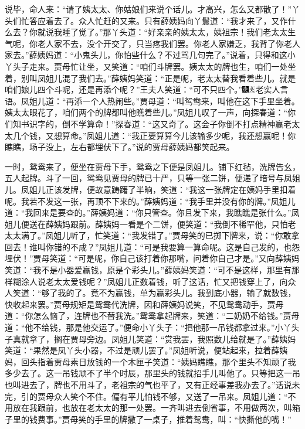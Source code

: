 说毕，命人来：``请了姨太太、你姑娘们来说个话儿。才高兴，怎么又都散了！''丫头们忙答应着去了。众人忙赶的又来。只有薛姨妈向丫鬟道：``我才来了，又作什么去？你就说我睡了觉了。''那丫头道：``好亲亲的姨太太，姨祖宗！我们老太太生气呢，你老人家不去，没个开交了，只当疼我们罢。你老人家嫌乏，我背了你老人家去。''薛姨妈道：``小鬼头儿，你怕些什么？不过骂几句完了。''说着，只得和这小丫头子走来。贾母忙让坐，又笑道：``咱们斗牌罢。姨太太的牌也生，咱们一处坐着，别叫凤姐儿混了我们去。''薛姨妈笑道：``正是呢，老太太替我看着些儿。就是咱们娘儿四个斗呢，还是再添个呢？''王夫人笑道：``可不只四个。''{\includegraphics[width=3mm]{../Images/00004}\includegraphics[width=3mm]{../Images/00012}\footnotesize \kaishu 老实人言语。}凤姐儿道：``再添一个人热闹些。''贾母道：``叫鸳鸯来，叫他在这下手里坐着。姨太太眼花了，咱们两个的牌都叫他瞧着些儿。''凤姐儿叹了一声，向探春道：``你们知书识字的，倒不学算命！''探春道：``这又奇了。这会子你倒不打点精神赢老太太几个钱，又想算命。''凤姐儿道：``我正要算算今儿该输多少呢，我还想赢呢！你瞧瞧，场子没上，左右都埋伏下了。''说的贾母薛姨妈都笑起来。

一时，鸳鸯来了，便坐在贾母下手，鸳鸯之下便是凤姐儿。铺下红毡，洗牌告幺，五人起牌。斗了一回，鸳鸯见贾母的牌已十严，只等一张二饼，便递了暗号与凤姐儿。凤姐儿正该发牌，便故意踌躇了半晌，笑道：``我这一张牌定在姨妈手里扣着呢。我若不发这一张，再顶不下来的。''薛姨妈道：``我手里并没有你的牌。''凤姐儿道：``我回来是要查的。''薛姨妈道：``你只管查。你且发下来，我瞧瞧是张什么。''凤姐儿便送在薛姨妈跟前。薛姨妈一看是个二饼，便笑道：``我倒不稀罕他，只怕老太太满了。''凤姐儿听了，忙笑道：``我发错了。''贾母笑的已掷下牌来，说：``你敢拿回去！谁叫你错的不成？''凤姐儿道：``可是我要算一算命呢。这是自己发的，也怨埋伏！''贾母笑道：``可是呢，你自己该打着你那嘴，问着你自己才是。''又向薛姨妈笑道：``我不是小器爱赢钱，原是个彩头儿。''薛姨妈笑道：``可不是这样，那里有那样糊涂人说老太太爱钱呢？''凤姐儿正数着钱，听了这话，忙又把钱穿上了，向众人笑道：``够了我的了。竟不为赢钱，单为赢彩头儿。我到底小器，输了就数钱，快收起来罢。''贾母规矩是鸳鸯代洗牌，因和薛姨妈说笑，不见鸳鸯动手，贾母道：``你怎么恼了，连牌也不替我洗。''鸳鸯拿起牌来，笑道：``二奶奶不给钱。''贾母道：``他不给钱，那是他交运了。''便命小丫头子：``把他那一吊钱都拿过来。''小丫头子真就拿了，搁在贾母旁边。凤姐儿笑道：``赏我罢，我照数儿给就是了。''薛姨妈笑道：``果然是凤丫头小器，不过是顽儿罢了。''凤姐听说，便站起来，拉着薛姨妈，回头指着贾母素日放钱的一个木匣子笑道：``姨妈瞧瞧，那个里头不知顽了我多少去了。这一吊钱顽不了半个时辰，那里头的钱就招手儿叫他了。只等把这一吊也叫进去了，牌也不用斗了，老祖宗的气也平了，又有正经事差我办去了。''话说未完，引的贾母众人笑个不住。偏有平儿怕钱不够，又送了一吊来。凤姐儿道：``不用放在我跟前，也放在老太太的那一处罢。一齐叫进去倒省事，不用做两次，叫箱子里的钱费事。''贾母笑的手里的牌撒了一桌子，推着鸳鸯，叫：``快撕他的嘴！''

